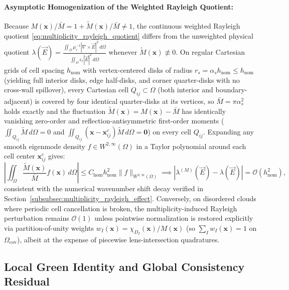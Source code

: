 \documentclass[VANCOUVER,Times1COL]{WileyNJD-v5}
\begin{document}
\paragraph*{Asymptotic Homogenization of the Weighted Rayleigh Quotient:}
Because $M(\mathbf{x})/\bar{M} = 1 + \widetilde{M}(\mathbf{x})/\bar{M} \ne 1$, the continuous weighted Rayleigh quotient \eqref{eq:multiplicity_rayleigh_quotient} differs from the unweighted physical quotient $\lambda(\vec{E}) = \frac{\iint_\Omega \mu_r^{-1}|\nabla\times\vec{E}|^2\,d\Omega}{\iint_\Omega \epsilon_r|\vec{E}|^2\,d\Omega}$ whenever $\widetilde{M}(\mathbf{x}) \not\equiv 0$. On regular Cartesian grids of cell spacing $h_{\mathrm{nom}}$ with vertex-centered disks of radius $r_s = \alpha_s h_{\mathrm{nom}} \le h_{\mathrm{nom}}$ (yielding full interior disks, edge half-disks, and corner quarter-disks with no cross-wall spillover), every Cartesian cell $Q_{ij} \subset \Omega$ (both interior and boundary-adjacent) is covered by four identical quarter-disks at its vertices, so $\bar{M} = \pi\alpha_s^2$ holds exactly and the fluctuation $\widetilde{M}(\mathbf{x}) = M(\mathbf{x}) - \bar{M}$ has identically vanishing zero-order and reflection-antisymmetric first-order moments ($\iint_{Q_{ij}} \widetilde{M}\,d\Omega = 0$ and $\iint_{Q_{ij}} (\mathbf{x}-\mathbf{x}_{ij}^c)\widetilde{M}\,d\Omega = \mathbf{0}$) on every cell $Q_{ij}$. Expanding any smooth eigenmode density $f \in W^{2,\infty}(\Omega)$ in a Taylor polynomial around each cell center $\mathbf{x}_{ij}^c$ gives:
\begin{equation}
    \left| \iint_{\Omega} \frac{\widetilde{M}(\mathbf{x})}{\bar{M}} f(\mathbf{x}) \, d\Omega \right| \le C_{\mathrm{hom}} h_{\mathrm{nom}}^2 \|f\|_{W^{2,\infty}(\Omega)} \implies \left| \lambda^{(M)}(\vec{E}) - \lambda(\vec{E}) \right| = \mathcal{O}(h_{\mathrm{nom}}^2),
    \label{eq:multiplicity_homogenization}
\end{equation}
consistent with the numerical wavenumber shift decay verified in Section~\ref{subsubsec:multiplicity_rayleigh_effect}. Conversely, on disordered clouds where periodic cell cancellation is broken, the multiplicity-induced Rayleigh perturbation remains $\mathcal{O}(1)$ unless pointwise normalization is restored explicitly via partition-of-unity weights $w_I(\mathbf{x}) = \chi_{D_I}(\mathbf{x})/M(\mathbf{x})$ (so $\sum_I w_I(\mathbf{x}) = 1$ on $\Omega_{\mathrm{cov}}$), albeit at the expense of piecewise lens-intersection quadratures.

\subsection{Local Green Identity and Global Consistency Residual}
\label{subsubsec:consistency_residual}
\end{document}
